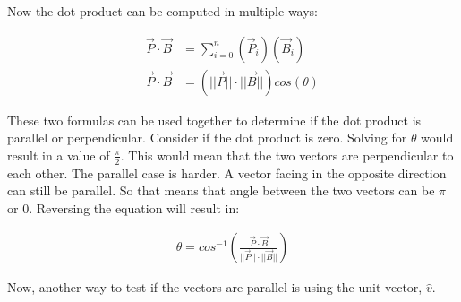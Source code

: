 \begin{center}  \end{center}

Now the dot product can be computed in multiple ways:

\begin{align*}	
	\vec{P} \cdot \vec{B} &= \sum^{n}_{i=0} (\vec{P}_i)(\vec{B}_i) \\ 
	\vec{P} \cdot \vec{B} &= (|| \vec{P} || \cdot || \vec{B} || )cos(\theta)
\end{align*}

These two formulas can be used together to determine if the dot product is parallel or perpendicular. 
Consider if the dot product is zero. Solving for $\theta$ would result in a value of $\frac{\pi}{2}$. This would mean that the two vectors
are perpendicular to each other. The parallel case is harder. 
A vector facing in the opposite direction can still be parallel. So that means that angle between the two vectors can be $\pi$ or $0$. Reversing the equation will result in: 

\begin{align*}
	\theta = cos^{-1}(\frac{\vec{P} \cdot \vec{B}}{|| \vec{P} || \cdot || \vec{B} ||})
\end{align*}

Now, another way to test if the vectors are parallel is using the unit vector, $\hat{v}$.